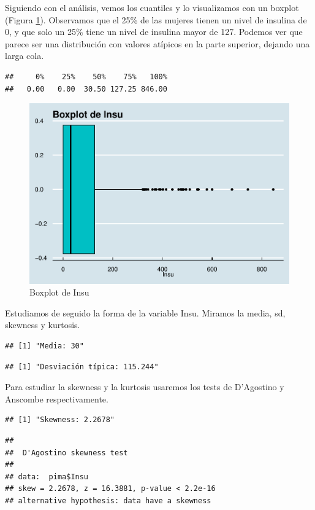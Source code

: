 \documentclass[
]{article}
\begin{document}
Siguiendo con el análisis, vemos los cuantiles y lo visualizamos con un
boxplot (Figura \ref{fig:box_insu}). Observamos que el 25\% de las
mujeres tienen un nivel de insulina de 0, y que solo un 25\% tiene un
nivel de insulina mayor de 127. Podemos ver que parece ser una
distribución con valores atípicos en la parte superior, dejando una
larga cola.

\begin{verbatim}
##     0%    25%    50%    75%   100% 
##   0.00   0.00  30.50 127.25 846.00
\end{verbatim}

\begin{figure}

{\centering \includegraphics[width=0.5\linewidth]{pima-clasificacion_files/figure-latex/box_insu-1} 

}

\caption{Boxplot de Insu}\label{fig:box_insu}
\end{figure}

Estudiamos de seguido la forma de la variable Insu. Miramos la media,
sd, skewness y kurtosis.

\begin{verbatim}
## [1] "Media: 30"
\end{verbatim}

\begin{verbatim}
## [1] "Desviación típica: 115.244"
\end{verbatim}

Para estudiar la skewness y la kurtosis usaremos los tests de D'Agostino
y Anscombe respectivamente.

\begin{verbatim}
## [1] "Skewness: 2.2678"
\end{verbatim}

\begin{verbatim}
## 
##  D'Agostino skewness test
## 
## data:  pima$Insu
## skew = 2.2678, z = 16.3881, p-value < 2.2e-16
## alternative hypothesis: data have a skewness
\end{verbatim}
\end{document}
